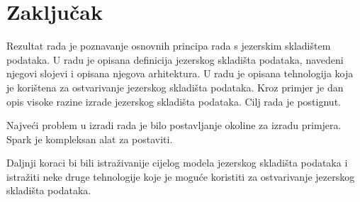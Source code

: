 \chapter{Zaključak} \label{chapter:zakljucak}

Rezultat rada je poznavanje osnovnih principa rada s jezerskim skladištem
podataka. U radu je opisana definicija jezerskog skladišta podataka, navedeni
njegovi slojevi i opisana njegova arhitektura. U radu je opisana tehnologija
koja je korištena za ostvarivanje jezerskog skladišta podataka. Kroz primjer
je dan opis visoke razine izrade jezerskog skladišta podataka. Cilj rada je
postignut.

Najveći problem u izradi rada je bilo postavljanje okoline za izradu primjera.
Spark je kompleksan alat za postaviti.

Daljnji koraci bi bili istraživanije cijelog modela jezerskog skladišta podataka
i istražiti neke druge tehnologije koje je moguće koristiti za ostvarivanje
jezerskog skladišta podataka.
